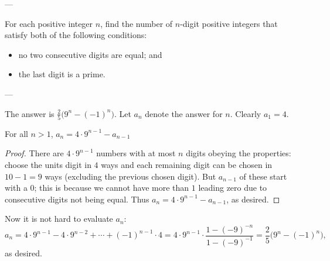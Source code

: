 
---

For each positive integer $n$, find the number of $n$-digit positive integers that satisfy both of the following conditions:
\begin{itemize}[itemsep=0em]
    \item no two consecutive digits are equal; and
    \item the last digit is a prime.
\end{itemize}

---

The answer is $\tfrac25\big(9^n-(-1)^n\big)$. Let $a_n$ denote the answer for $n$. Clearly $a_1=4$.
\begin{iclaim*}
    For all $n>1$, $a_n=4\cdot9^{n-1}-a_{n-1}$
\end{iclaim*}
\begin{proof}
    There are $4\cdot9^{n-1}$ numbers with at most $n$ digits obeying the properties: choose the units digit in $4$ ways and each remaining digit can be chosen in $10-1=9$ ways (excluding the previous chosen digit). But $a_{n-1}$ of these start with a $0$; this is because we cannot have more than $1$ leading zero due to consecutive digits not being equal. Thus $a_n=4\cdot9^{n-1}-a_{n-1}$, as desired.
\end{proof}

Now it is not hard to evaluate $a_n$: $$a_n=4\cdot9^{n-1}-4\cdot9^{n-2}+\cdots+(-1)^{n-1}\cdot4=4\cdot9^{n-1}\cdot\frac{1-(-9)^{-n}}{1-(-9)^{-1}}=\frac25\big(9^n-(-1)^n\big),$$
as desired.
